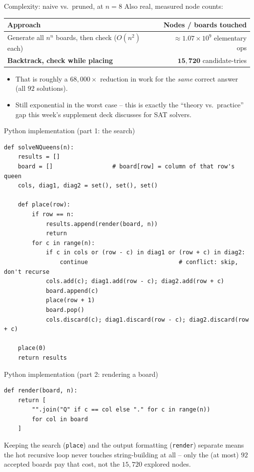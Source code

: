 \documentclass[11pt,aspectratio=169]{beamer}
\begin{document}
\begin{frame}{Complexity: naive vs.\ pruned, at $n=8$}
  \small
  Also real, measured node counts:
  \begin{center}
  \begin{tabular}{@{}lr@{}}
    \toprule
    Approach & Nodes / boards touched \\
    \midrule
    Generate all $n^n$ boards, then check ($O(n^2)$ each) & $\approx 1.07 \times 10^{9}$
    elementary ops \\
    \textbf{Backtrack, check while placing} & $\mathbf{15{,}720}$ candidate-tries \\
    \bottomrule
  \end{tabular}
  \end{center}
  \begin{itemize}
    \item That is roughly a $68{,}000\times$ reduction in work for the \emph{same}
    correct answer (all $92$ solutions).
    \item Still exponential in the worst case -- this is exactly the ``theory vs.\
    practice'' gap this week's supplement deck discusses for SAT solvers.
  \end{itemize}
\end{frame}

\begin{frame}[fragile]{Python implementation (part 1: the search)}
  \begin{lstlisting}[style=py,aboveskip=0pt,belowskip=0pt]
def solveNQueens(n):
    results = []
    board = []                 # board[row] = column of that row's queen
    cols, diag1, diag2 = set(), set(), set()

    def place(row):
        if row == n:
            results.append(render(board, n))
            return
        for c in range(n):
            if c in cols or (row - c) in diag1 or (row + c) in diag2:
                continue                          # conflict: skip, don't recurse
            cols.add(c); diag1.add(row - c); diag2.add(row + c)
            board.append(c)
            place(row + 1)
            board.pop()
            cols.discard(c); diag1.discard(row - c); diag2.discard(row + c)

    place(0)
    return results
  \end{lstlisting}
\end{frame}

\begin{frame}[fragile]{Python implementation (part 2: rendering a board)}
  \begin{lstlisting}[style=py,aboveskip=0pt,belowskip=0pt]
def render(board, n):
    return [
        "".join("Q" if c == col else "." for c in range(n))
        for col in board
    ]
  \end{lstlisting}
  \vspace{0.5em}
  Keeping the search (\texttt{place}) and the output formatting (\texttt{render})
  separate means the hot recursive loop never touches string-building at all -- only
  the (at most) $92$ accepted boards pay that cost, not the $15{,}720$ explored nodes.
\end{frame}
\end{document}
